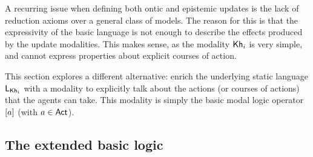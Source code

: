\begin{textonuevo}
A recurring issue when defining both ontic and epistemic updates is the lack of reduction axioms over a general class of models. The reason for this is that the expressivity of the basic language is not enough to describe the effects produced by the update modalities. This makes sense, as the modality ${\sf Kh}_i$ is very simple, and cannot express properties about explicit courses of action.
\end{textonuevo} 
%
%
%
This section explores a different alternative: enrich the underlying static language $\mathsf{L}_{{\sf Kh}_i}$ with a modality to explicitly talk about the actions (or courses of actions) that the agents can take. This modality is simply the basic modal logic operator $[a]$ (with $a\in{\rm \sf Act}$). 

\subsection{The extended basic logic}

